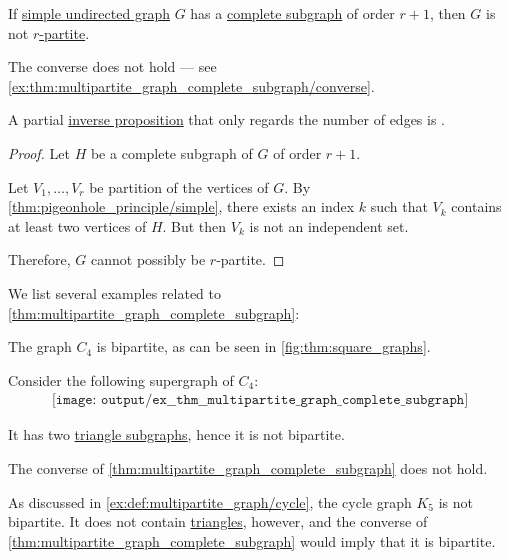 \begin{proposition}\label{thm:multipartite_graph_complete_subgraph}
  If \hyperref[def:undirected_graph]{simple undirected graph} \( G \) has a \hyperref[def:complete_subgraph]{complete subgraph} of order \( r + 1 \), then \( G \) is not \hyperref[def:multipartite_graph]{\( r \)-partite}.
\end{proposition}
\begin{comments}
  \item The converse does not hold --- see \cref{ex:thm:multipartite_graph_complete_subgraph/converse}.

  \item A partial \hyperref[def:conditional_formula/inverse]{inverse proposition} that only regards the number of edges is .
\end{comments}
\begin{proof}
  Let \( H \) be a complete subgraph of \( G \) of order \( r + 1 \).

  Let \( V_1, \ldots, V_r \) be  partition of the vertices of \( G \). By \cref{thm:pigeonhole_principle/simple}, there exists an index \( k \) such that \( V_k \) contains at least two vertices of \( H \). But then \( V_k \) is not an independent set.

  Therefore, \( G \) cannot possibly be \( r \)-partite.
\end{proof}

\begin{example}\label{ex:thm:multipartite_graph_complete_subgraph}
  We list several examples related to \cref{thm:multipartite_graph_complete_subgraph}:
  \begin{thmenum}
     The graph \( C_4 \) is bipartite, as can be seen in \cref{fig:thm:square_graphs}.

    Consider the following supergraph of \( C_4 \):
    \begin{equation}\label{eq:ex:thm:multipartite_graph_complete_subgraph/triangle}
      \begin{aligned}
        \texttt{[image: output/ex\_\_thm\_\_multipartite\_graph\_complete\_subgraph]}
      \end{aligned}
    \end{equation}

    It has two \hyperref[def:triangle_graph]{triangle subgraphs}, hence it is not bipartite.

     The converse of \cref{thm:multipartite_graph_complete_subgraph} does not hold.

    As discussed in \cref{ex:def:multipartite_graph/cycle}, the cycle graph \( K_5 \) is not bipartite. It does not contain \hyperref[def:triangle_graph]{triangles}, however, and the converse of \cref{thm:multipartite_graph_complete_subgraph} would imply that it is bipartite.
  \end{thmenum}
\end{example}

